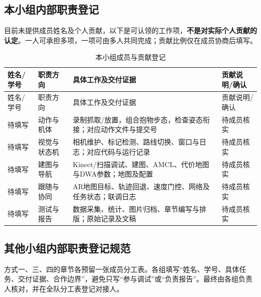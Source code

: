 \subsection{本小组内部职责登记}
目前未提供成员姓名及个人贡献，以下是可认领的工作项，\textbf{不是对实际个人贡献的认定}。一人可承担多项，一项可由多人共同完成；贡献比例仅在成员协商后填写。
\begin{longtable}{p{23mm}p{26mm}p{48mm}p{37mm}}
\caption{本小组成员与贡献登记}\\\toprule
姓名/学号 & 职责方向 & 具体工作及交付证据 & 贡献说明/确认\\\midrule\endfirsthead
\toprule 姓名/学号 & 职责方向 & 具体工作及交付证据 & 贡献说明/确认\\\midrule\endhead
待填写 & 动作与机体 & 录制抓取/放置，组合抱物步态，检查姿态衔接；对应动作文件与提交号 & 待成员核实\\
待填写 & 视觉与状态机 & 相机维护、标记检测、路线切换、窗口与日志；对应代码与运行记录 & 待成员核实\\
待填写 & 建图与导航 & Kinect/扫描调试、建图、AMCL、代价地图与DWA参数；地图及配置 & 待成员核实\\
待填写 & 跟随与协同 & AR地图目标、轨迹回退、速度门控、网络及任务状态；联调日志 & 待成员核实\\
待填写 & 测试与报告 & 数据采集、统计、图片归档、章节编写与排版；原始记录及文稿 & 待成员核实\\\bottomrule
\end{longtable}

\subsection{其他小组内部职责登记规范}
方式一、三、四的章节各预留一张成员分工表。各组填写“姓名、学号、具体任务、交付证据、合作边界”，避免只写“参与调试”或“负责报告”。最终由各组负责人核对，并在全队分工表登记对接人。
